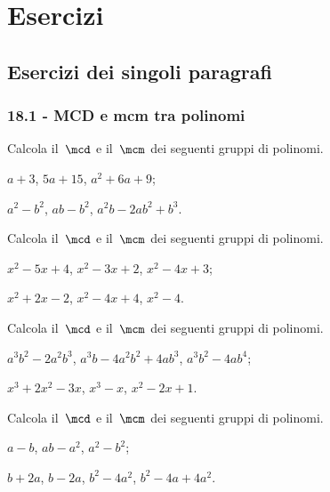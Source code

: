 \section{Esercizi}
\subsection{Esercizi dei singoli paragrafi}
\subsubsection*{18.1 - MCD e mcm tra polinomi}

\begin{esercizio}[\Ast]
\label{ese:18.1}
Calcola il~$\mcd$ e il~$\mcm$ dei seguenti gruppi di polinomi.
\begin{multicols}{2}
\begin{enumeratea}
 \item $a+3$, $5a+15$, $a^{2}+6a+9$;
 \item $a^{2}-b^{2}$, $ab-b^{2}$, $a^{2}b-2ab^{2}+b^{3}$.
\end{enumeratea}
\end{multicols}
\end{esercizio}

\begin{esercizio}[\Ast]
\label{ese:18.2}
Calcola il~$\mcd$ e il~$\mcm$ dei seguenti gruppi di polinomi.
\begin{multicols}{2}
\begin{enumeratea}
 \item $x^{2}-5x+4$, $x^{2}-3x+2$, $x^{2}-4x+3$;
 \item $x^{2}+2x-2$, $x^{2}-4x+4$, $x^{2}-4$.
\end{enumeratea}
\end{multicols}
\end{esercizio}

\begin{esercizio}[\Ast]
\label{ese:18.3}
Calcola il~$\mcd$ e il~$\mcm$ dei seguenti gruppi di polinomi.
\begin{enumeratea}
 \item $a^{3}b^{2}-2a^{2}b^{3}$, $a^{3}b-4a^{2}b^{2}+4ab^{3}$, $a^{3}b^{2}-4ab^{4}$;
 \item $x^{3}+2x^{2}-3x$, $x^{3}-x$, $x^{2}-2x+1$.
\end{enumeratea}
\end{esercizio}

\begin{esercizio}[\Ast]
\label{ese:18.4}
Calcola il~$\mcd$ e il~$\mcm$ dei seguenti gruppi di polinomi.
\begin{multicols}{2}
\begin{enumeratea}
 \item $a-b$, $ab-a^{2}$, $a^{2}-b^{2}$;
 \item $b+2a$, $b-2a$, $b^{2}-4a^{2}$, $b^{2}-4a+4a^{2}$.
\end{enumeratea}
\end{multicols}
\end{esercizio}

